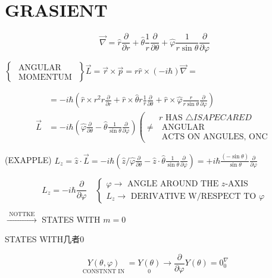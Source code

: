 \section*{GRASIENT}
$$
\vec{\nabla}=\hat{r} \frac{\partial}{\partial r}+\hat{\theta} \frac{1}{r} \frac{\partial}{\partial \theta}+\hat{\varphi} \frac{1}{r \sin \theta} \frac{\partial}{\partial \varphi}
$$

$\left\{\begin{array}{c}\text { ANGULAR } \\ \text { MOMENTUM }\end{array}\right\} \vec{L}=\vec{r} \times \vec{p}=r \hat{r} \times(-i \hbar) \vec{\nabla}=$

$$
\begin{aligned}
& =-i \hbar\left(\hat{r} \times r^{2} r \frac{\partial}{\partial r}+\hat{r} \times \hat{\theta} r \frac{1}{r} \frac{\partial}{\partial \theta}+\hat{r} \times \hat{\varphi} \frac{r}{r \sin \theta} \frac{\partial}{\partial \varphi}\right) \\
\vec{L} & =-i \hbar\left(\hat{\varphi} \frac{\partial}{\partial \theta}-\hat{\theta} \frac{1}{\sin \theta} \frac{\partial}{\partial \varphi}\right)\left(\neq \begin{array}{c}
r \text { HAS } \triangle I S A P E C A R E D \\
\text { ANGULAR } \\
\text { ACTS ON ANGULES, ONC }
\end{array}\right.
\end{aligned}
$$

(EXAPPLE) $L_{z}=\hat{z} \cdot \vec{L}=-i \hbar\left(\hat{z} / \hat{\varphi} \frac{\partial}{\partial \theta}-\hat{z} \cdot \hat{\theta} \frac{1}{\sin \theta} \frac{\partial}{\partial \varphi}\right)=+i \hbar \frac{(-\sin \theta)}{\sin \theta} \frac{\partial}{\partial \varphi}$

$$
L_{z}=-i \hbar \frac{\partial}{\partial \varphi} \quad\left\{\begin{array}{l}
\varphi \rightarrow \text { ANGLE AROUND THE } z \text {-AXIS } \\
L_{z} \rightarrow \text { DERIVATIVE W/RESPECT TO } \varphi
\end{array}\right.
$$

$\xrightarrow{\text { NOTTKE }}$ STATES WITH $m=0$

STATES WITH几者0

$$
\underset{\text { CONSTNNT IN }}{Y(\theta, \varphi)}=\underset{0}{Y(\theta)} \rightarrow \frac{\partial}{\partial \varphi} Y(\theta)=0_{0}^{\nabla}
$$

